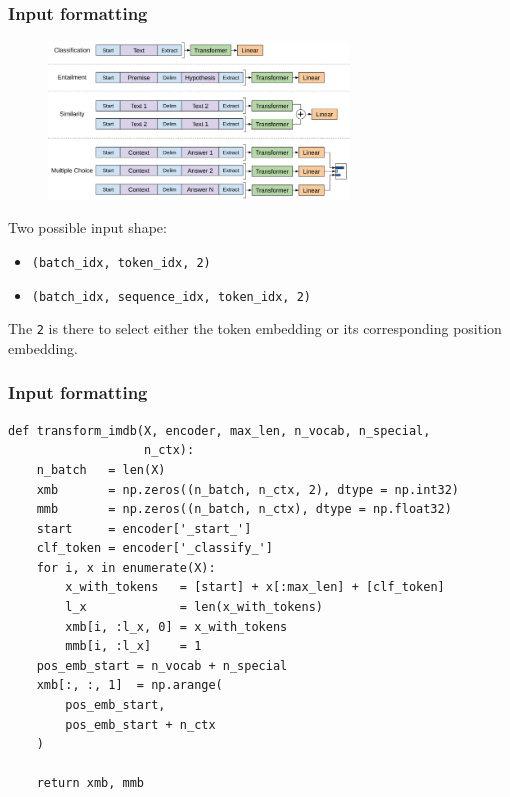 \documentclass[9pt]{beamer}
\begin{document}
\begin{frame}
  \frametitle{Input formatting}

  \begin{figure}
    \includegraphics[width = 8cm]{images/input_formatting.png}
  \end{figure}

  Two possible input shape:

  \begin{itemize}
  \item \texttt{(batch\_idx, token\_idx, 2)}
  \item \texttt{(batch\_idx, sequence\_idx, token\_idx, 2)}
  \end{itemize}

  \bigskip

  The \texttt{2} is there to select either the token embedding or its
  corresponding position embedding.
\end{frame}

\begin{frame}[fragile]
  \frametitle{Input formatting}

  \begin{lstlisting}
def transform_imdb(X, encoder, max_len, n_vocab, n_special,
                   n_ctx):
    n_batch   = len(X)
    xmb       = np.zeros((n_batch, n_ctx, 2), dtype = np.int32)
    mmb       = np.zeros((n_batch, n_ctx), dtype = np.float32)
    start     = encoder['_start_']
    clf_token = encoder['_classify_']
    for i, x in enumerate(X):
        x_with_tokens   = [start] + x[:max_len] + [clf_token]
        l_x             = len(x_with_tokens)
        xmb[i, :l_x, 0] = x_with_tokens
        mmb[i, :l_x]    = 1
    pos_emb_start = n_vocab + n_special
    xmb[:, :, 1]  = np.arange(
        pos_emb_start,
        pos_emb_start + n_ctx
    )

    return xmb, mmb
  \end{lstlisting}
\end{frame}
\end{document}
